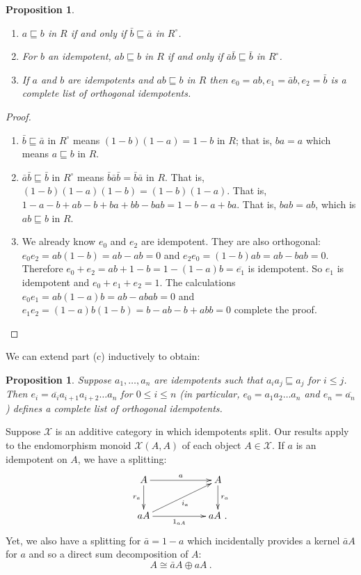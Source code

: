 \documentclass[a4paper,12pt,reqno]{amsart}
\newtheorem{proposition}[theorem]{Proposition}
\theoremstyle{definition}
\theoremstyle{fact}
\theoremstyle{genquest}
\theoremstyle{step}
\def\CX{{\mathscr X}}
\begin{document}
\begin{proposition}
\begin{enumerate}
\item[(a)] $a\sqsubseteq b$ in $R$ if and only if $\bar{b}\sqsubseteq \bar{a}$ in $R^{\circ}$. 
\item[(b)] For $b$ an idempotent, 
$ab\sqsubseteq b$ in $R$ if and only if $\bar{a}\bar{b}\sqsubseteq \bar{b}$ in $R^{\circ}$.
\item[(c)] If $a$ and $b$ are idempotents and $ab\sqsubseteq b$ in $R$ then 
$e_0=ab, e_1=\bar{a}b, e_2=\bar{b}$
is a complete list of orthogonal idempotents. 
\end{enumerate}
\end{proposition}
\begin{proof}
\begin{enumerate}
\item[(a)] $\bar{b}\sqsubseteq \bar{a}$ in $R^{\circ}$ means $(1-b)(1-a) = 1-b$ in $R$; 
that is, $ba=a$ which means $a\sqsubseteq b$ in $R$. 
\item[(b)] $\bar{a}\bar{b}\sqsubseteq \bar{b}$ in $R^{\circ}$ means 
$\bar{b}\bar{a}\bar{b}= \bar{b}\bar{a}$ in $R$. That is, 
$(1-b)(1-a)(1-b) = (1-b)(1-a)$.
That is, $1-a-b+ab-b+ba+bb-bab = 1-b-a+ba$.
That is, $bab = ab$, which is $ab\sqsubseteq b$ in $R$. 
\item[(c)] We already know $e_0$ and $e_2$ are idempotent.
They are also orthogonal: $e_0e_2 = ab(1-b)=ab-ab=0$
and $e_2e_0=(1-b)ab=ab-bab=0$. 
Therefore $e_0+e_2 = ab + 1 - b = 1-(1-a)b = \overline{e_1}$
is idempotent. So $e_1$ is idempotent and $e_0+e_1+e_2=1$.
The calculations $e_0e_1=ab(1-a)b=ab-abab=0$ and 
$e_1e_2=(1-a)b(1-b)=b-ab-b+abb=0$ complete the proof.
\end{enumerate}
\end{proof}

We can extend part (c) inductively to obtain: 

\begin{proposition}\label{weakcommute}
Suppose $a_1, \dots , a_n$ are idempotents such that $a_ia_j\sqsubseteq a_j$ for $i\le j$.
Then $e_i = \overline{a_i}a_{i+1}a_{i+2} \dots a_{n}$ for $0\le i \le n$
(in particular, $e_0 = a_1a_2\dots a_n$ and $e_n = \overline{a_n}$)
defines a complete list of orthogonal idempotents. 
\end{proposition}

Suppose $\CX$ is an additive category in which idempotents split.
Our results apply to the endomorphism monoid $\CX (A,A)$ of
each object $A\in \CX$. If $a$ is an idempotent on $A$, we have
a splitting:
\begin{equation*}
\xymatrix{
A \ar[rr]^-{a} \ar[d]_-{r_a} && A \ar[d]^-{r_a} \\
aA \ar[rr]_-{1_{aA}} \ar[rru]_-{i_{a}} && aA \ .}
\end{equation*} 
Yet, we also have a splitting for $\bar{a} = 1-a$ which incidentally provides a kernel
$\bar{a}A$ for $a$ and so a direct sum decomposition of $A$:
$$A \cong \bar{a}A\oplus aA \ .$$
\end{document}
